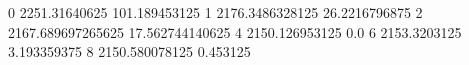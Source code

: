 0 2251.31640625 101.189453125
1 2176.3486328125 26.2216796875
2 2167.689697265625 17.562744140625
4 2150.126953125 0.0
6 2153.3203125 3.193359375
8 2150.580078125 0.453125
